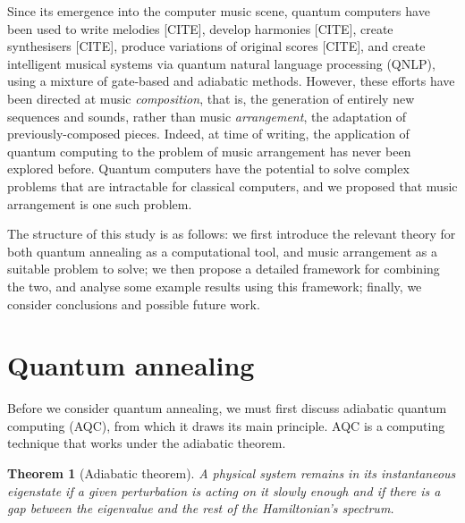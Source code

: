 \documentclass[12pt]{article}
\newtheorem*{theorem}{Theorem}
\theoremstyle{definition}
\begin{document}
Since its emergence into the computer music scene, quantum computers have been used to write melodies [CITE], develop harmonies [CITE], create synthesisers [CITE], produce variations of original scores [CITE], and create intelligent musical systems via quantum natural language processing (QNLP), using a mixture of gate-based and adiabatic methods. However, these efforts have been directed at music \emph{composition}, that is, the generation of entirely new sequences and sounds, rather than music \emph{arrangement}, the adaptation of previously-composed pieces. Indeed, at time of writing, the application of quantum computing to the problem of music arrangement has never been explored before. Quantum computers have the potential to solve complex problems that are intractable for classical computers, and we proposed that music arrangement is one such problem.

The structure of this study is as follows: we first introduce the relevant theory for both quantum annealing as a computational tool, and music arrangement as a suitable problem to solve; we then propose a detailed framework for combining the two, and analyse some example results using this framework; finally, we consider conclusions and possible future work.

\section{Quantum annealing}

Before we consider quantum annealing, we must first discuss adiabatic quantum computing (AQC), from which it draws its main principle. AQC is a computing technique that works under the adiabatic theorem.

\begin{theorem}[Adiabatic theorem]
    A physical system remains in its instantaneous eigenstate if a given perturbation is acting on it slowly enough and if there is a gap between the eigenvalue and the rest of the Hamiltonian's spectrum. \cite{born_beweis_1928}
\end{theorem}
\end{document}
